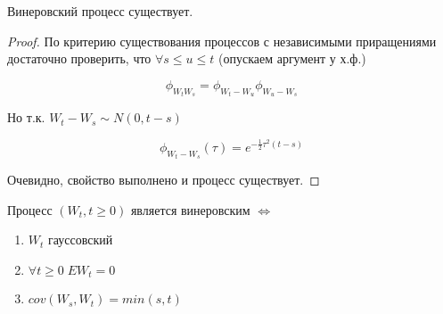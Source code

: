 \begin{statement}
Винеровский процесс существует.
\end{statement}
\begin{proof}
По критерию существования процессов с независимыми приращениями достаточно проверить, что
$\forall s \leq u \leq t$ (опускаем аргумент у х.ф.)

$$\phi_{W_t W_s}  = \phi_{W_t-W_u} \phi_{W_u-W_s}$$

Но т.к. $W_t-W_s \sim N(0, t-s)$

$$\phi_{W_t-W_s}(\tau) = e^{-\frac12 \tau^2(t-s)}$$

Очевидно, свойство выполнено и процесс существует.
\end{proof}

\begin{theorem}
Процесс $(W_t, t \geq 0)$  является винеровским $\Leftrightarrow$
\begin{enumerate}
\item $W_t$ гауссовский
\item $\forall t \geq 0 \; EW_t = 0$
\item $cov(W_s, W_t) = min(s, t)$
\end{enumerate}
\end{theorem}
